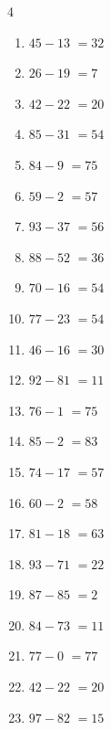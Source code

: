 \begin{multicols}{4}
\begin{enumerate}
  \item $45-13$
        $=32$

  \item $26-19$
        $=7$

  \item $42-22$
        $=20$

  \item $85-31$
        $=54$

  \item $84-9$
        $=75$

  \item $59-2$
        $=57$

  \item $93-37$
        $=56$

  \item $88-52$
        $=36$

  \item $70-16$
        $=54$

  \item $77-23$
        $=54$

  \item $46-16$
        $=30$

  \item $92-81$
        $=11$

  \item $76-1$
        $=75$

\columnbreak %

  \item $85-2$
        $=83$

  \item $74-17$
        $=57$

  \item $60-2$
        $=58$

  \item $81-18$
        $=63$

  \item $93-71$
        $=22$

  \item $87-85$
        $=2$

  \item $84-73$
        $=11$

  \item $77-0$
        $=77$

  \item $42-22$
        $=20$

  \item $97-82$
        $=15$


\end{enumerate}
\end{multicols}
